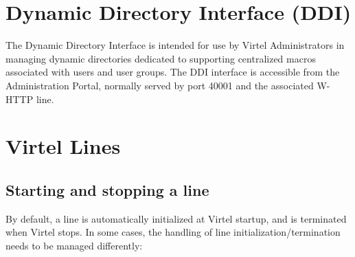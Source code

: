 \documentclass[letterpaper,10pt,english]{sphinxmanual}
\begin{document}
\begin{sphinxVerbatim}[commandchars=\\\{\}]
       
      

    
        
\end{sphinxVerbatim}


\ignorespaces 

\chapter{Dynamic Directory Interface (DDI)}
\label{\detokenize{Customization:dynamic-directory-interface-ddi}}\label{\detokenize{Customization:index-48}}
The Dynamic Directory Interface is intended for use by Virtel Administrators in managing dynamic directories dedicated to supporting centralized macros associated with users and user groups. The DDI interface is accessible from the Administration Portal, normally served by port 40001 and the associated W-HTTP line.



\ignorespaces 

\chapter{Virtel Lines}
\label{\detokenize{Customization:virtel-lines}}\label{\detokenize{Customization:index-49}}
\ignorespaces 

\section{Starting and stopping a line}
\label{\detokenize{Customization:starting-and-stopping-a-line}}\label{\detokenize{Customization:index-50}}
By default, a line is automatically initialized at Virtel startup, and is terminated when Virtel stops. In some cases, the handling of line initialization/termination needs to be managed differently:
\end{document}
